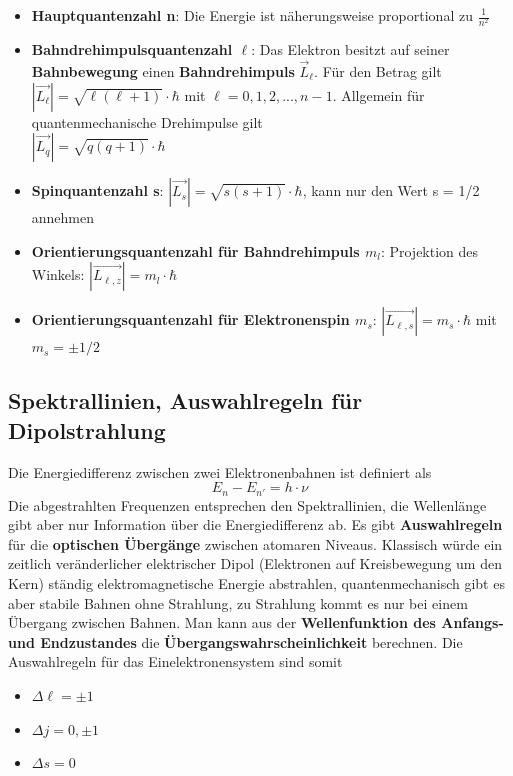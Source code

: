 \documentclass[12pt,a4paper,ngerman]{article}
\begin{document}
\begin{itemize}
\item \textbf{Hauptquantenzahl n}: Die Energie ist näherungsweise proportional zu $\frac{1}{n^2}$
\item \textbf{Bahndrehimpulsquantenzahl $\ell$}: Das Elektron besitzt auf seiner \textbf{Bahnbewegung} einen \textbf{Bahndrehimpuls} $\vec{L}_\ell$. Für den Betrag gilt $|\vec{L_\ell}| = \sqrt{\ell (\ell + 1)}\cdot \hbar$ mit $\ell = 0,1,2,...,n-1$. Allgemein für quantenmechanische Drehimpulse gilt \\ $|\vec{L_q}| = \sqrt{q (q + 1)}\cdot \hbar$
\item \textbf{Spinquantenzahl s}: $|\vec{L_s}| = \sqrt{s (s + 1)}\cdot \hbar$, kann nur den Wert s = 1/2 annehmen
\item \textbf{Orientierungsquantenzahl für Bahndrehimpuls $m_l$}: Projektion des Winkels: $|\vec{L_{\ell,z}}| = m_l \cdot \hbar$
\item \textbf{Orientierungsquantenzahl für Elektronenspin $m_s$}: $|\vec{L_{\ell,s}}| = m_s \cdot \hbar$ mit $m_s = \pm 1/2$
\end{itemize}

\subsection{Spektrallinien, Auswahlregeln für Dipolstrahlung}
Die Energiedifferenz zwischen zwei Elektronenbahnen ist definiert als
\begin{equation}
E_n - E_{n'} = h \cdot \nu
\end{equation}
Die abgestrahlten Frequenzen entsprechen den Spektrallinien, die Wellenlänge gibt aber nur Information über die Energiedifferenz ab. Es gibt \textbf{Auswahlregeln} für die \textbf{optischen Übergänge} zwischen atomaren Niveaus. Klassisch würde ein zeitlich veränderlicher elektrischer Dipol (Elektronen auf Kreisbewegung um den Kern) ständig elektromagnetische Energie abstrahlen, quantenmechanisch gibt es aber stabile Bahnen ohne Strahlung, zu Strahlung kommt es nur bei einem Übergang zwischen Bahnen. Man kann aus der \textbf{Wellenfunktion des Anfangs- und Endzustandes} die \textbf{Übergangswahrscheinlichkeit} berechnen. 
Die Auswahlregeln für das Einelektronensystem sind somit
\begin{itemize}
\item $\Delta \ell = \pm 1$
\item $\Delta j = 0,\pm 1$
\item $\Delta s = 0$
\end{itemize}
\end{document}
